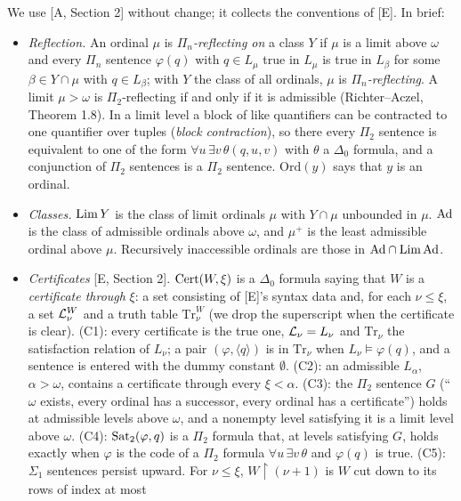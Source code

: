 \documentclass[11pt]{article}
\begin{document}
We use [A, Section 2] without change; it collects the conventions of [E]. In brief:
\begin{itemize}
\item \emph{Reflection.} An ordinal $\mu$ is \emph{$\Pi_n$-reflecting on} a class $Y$ if $\mu$ is a limit above
  $\omega$ and every $\Pi_n$ sentence $\varphi(q)$ with $q \in L_\mu$ true in $L_\mu$ is true in $L_\beta$ for some
  $\beta \in Y \cap \mu$ with $q \in L_\beta$; with $Y$ the class of all ordinals, $\mu$ is \emph{$\Pi_n$-reflecting}.
  A limit $\mu > \omega$ is $\Pi_2$-reflecting if and only if it is admissible (Richter--Aczel, Theorem 1.8). In a limit
  level a block of like quantifiers can be contracted to one quantifier over tuples (\emph{block contraction}), so there
  every $\Pi_2$ sentence is equivalent to one of the form $\forall u\, \exists v\, \theta(q,u,v)$ with $\theta$ a
  $\Delta_0$ formula, and a conjunction of $\Pi_2$ sentences is a $\Pi_2$ sentence. $\mathrm{Ord}(y)$ says that $y$ is
  an ordinal.
\item \emph{Classes.} $\mathrm{Lim}\, Y$ is the class of limit ordinals $\mu$ with $Y \cap \mu$ unbounded in $\mu$. $\mathrm{Ad}$ is the
  class of admissible ordinals above $\omega$, and $\mu^+$ is the least admissible ordinal above $\mu$. Recursively
  inaccessible ordinals are those in $\mathrm{Ad} \cap \mathrm{Lim}\, \mathrm{Ad}$.
\item \emph{Certificates} [E, Section 2]. $\mathrm{Cert}(W, \xi)$ is a $\Delta_0$ formula saying that $W$ is a
  \emph{certificate through} $\xi$: a set consisting of [E]'s syntax data and, for each $\nu \le \xi$, a set
  $\mathcal{L}^W_\nu$ and a truth table $\mathrm{Tr}^W_\nu$ (we drop the superscript when the certificate is clear). (C1): every
  certificate is the true one, $\mathcal{L}_\nu = L_\nu$ and $\mathrm{Tr}_\nu$ the satisfaction relation of $L_\nu$; a pair
  $(\varphi, \langle q\rangle)$ is in $\mathrm{Tr}_\nu$ when $L_\nu \models \varphi(q)$, and a sentence is entered with
  the dummy constant $\emptyset$. (C2): an admissible $L_\alpha$, $\alpha > \omega$, contains a certificate through
  every $\xi < \alpha$. (C3): the $\Pi_2$ sentence $G$ (``$\omega$ exists, every ordinal has a successor, every ordinal
  has a certificate'') holds at admissible levels above $\omega$, and a nonempty level satisfying it is a limit level
  above $\omega$. (C4): $\mathrm{Sat}_2(\varphi, q)$ is a $\Pi_2$ formula that, at levels satisfying $G$, holds exactly when
  $\varphi$ is the code of a $\Pi_2$ formula $\forall u\, \exists v\, \theta$ and $\varphi(q)$ is true. (C5): $\Sigma_1$
  sentences persist upward. For $\nu \le \xi$, $W{\restriction}(\nu+1)$ is $W$ cut down to its rows of index at most

\end{itemize}
\end{document}
